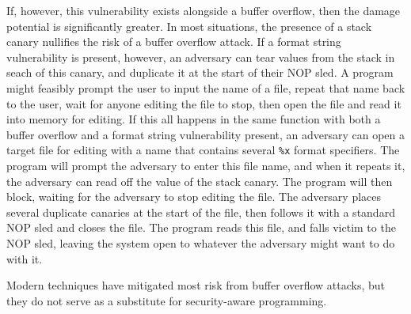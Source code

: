 If, however, this vulnerability exists alongside a buffer overflow, then the damage potential is significantly greater.
In most situations, the presence of a stack canary nullifies the risk of a buffer overflow attack. If a format string
vulnerability is present, however, an adversary can tear values from the stack in seach of this canary, and duplicate it
at the start of their NOP sled. A program might feasibly prompt the user to input the name of a file, repeat that name
back to the user, wait for anyone editing the file to stop, then open the file and read it into memory for editing. If
this all happens in the same function with both a buffer overflow and a format string vulnerability present, an
adversary can open a target file for editing with a name that contains several {\tt \%x} format specifiers. The program
will prompt the adversary to enter this file name, and when it repeats it, the adversary can read off the value of the
stack canary. The program will then block, waiting for the adversary to stop editing the file. The adversary places
several duplicate canaries at the start of the file, then follows it with a standard NOP sled and closes the file. The
program reads this file, and falls victim to the NOP sled, leaving the system open to whatever the adversary might want
to do with it.

Modern techniques have mitigated most risk from buffer overflow attacks, but they do not serve as a substitute for
security-aware programming.
